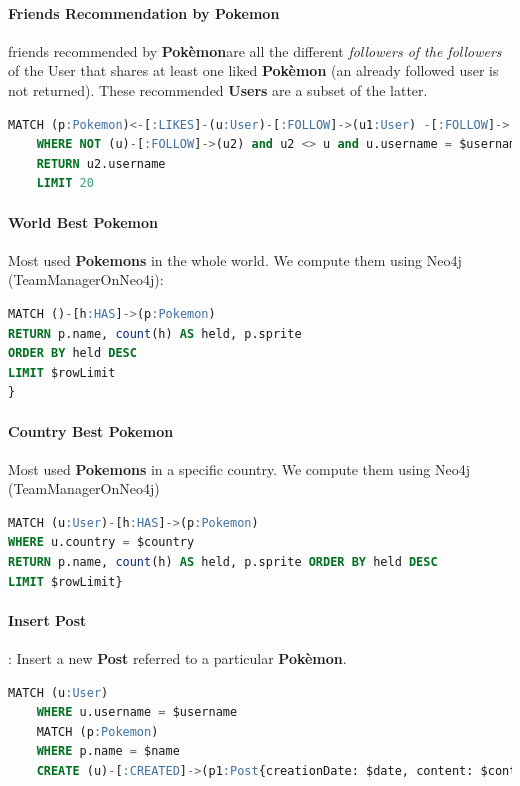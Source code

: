 \paragraph{Friends Recommendation by Pokemon} friends recommended by \textbf{Pokèmon}are all the different \textit{followers of the followers} of the User that shares at least one liked \textbf{Pokèmon} (an already followed user is not returned). These recommended \textbf{Users} are a subset of the latter.
\begin{lstlisting}[language=SQL]
	MATCH (p:Pokemon)<-[:LIKES]-(u:User)-[:FOLLOW]->(u1:User) -[:FOLLOW]->(u2:User)-[:LIKES]->(p2:Pokemon) 
	WHERE NOT (u)-[:FOLLOW]->(u2) and u2 <> u and u.username = $username and p2 = p 
	RETURN u2.username 
	LIMIT 20
\end{lstlisting}


\paragraph{World Best Pokemon}
Most used \textbf{Pokemons} in the whole world. We compute them using Neo4j (TeamManagerOnNeo4j):

\begin{lstlisting}[language=SQL]
MATCH ()-[h:HAS]->(p:Pokemon) 
RETURN p.name, count(h) AS held, p.sprite 
ORDER BY held DESC 
LIMIT $rowLimit
}
\end{lstlisting}

\paragraph{Country Best Pokemon}
Most used \textbf{Pokemons} in a specific country. We compute them using Neo4j (TeamManagerOnNeo4j)

\begin{lstlisting}[language=SQL]
MATCH (u:User)-[h:HAS]->(p:Pokemon) 
WHERE u.country = $country 
RETURN p.name, count(h) AS held, p.sprite ORDER BY held DESC 
LIMIT $rowLimit}
\end{lstlisting}

\paragraph{Insert Post}: Insert a new \textbf{Post} referred to a particular \textbf{Pokèmon}.
\begin{lstlisting}[language=SQL]
	MATCH (u:User) 
	WHERE u.username = $username 
	MATCH (p:Pokemon) 
	WHERE p.name = $name 
	CREATE (u)-[:CREATED]->(p1:Post{creationDate: $date, content: $content})-[:TOPIC]->(p)
\end{lstlisting}

